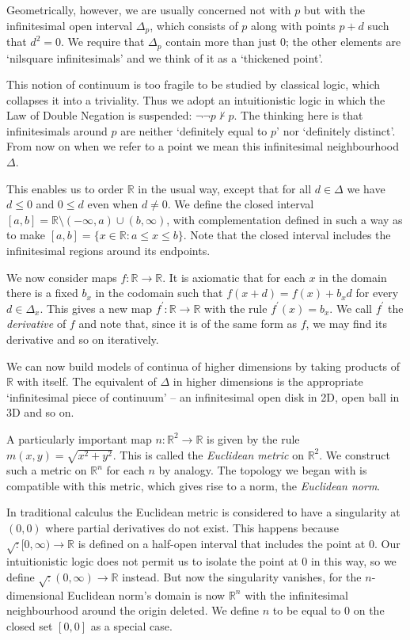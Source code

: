 \documentclass[oneside,english]{amsbook}
\numberwithin{section}{chapter}
\theoremstyle{plain}
\theoremstyle{definition}
\begin{document}
Geometrically, however, we are usually concerned not with $p$ but with the infinitesimal open interval $\Delta_p$, which consists of $p$ along with points $p + d$ such that $d^2 = 0$. We require that $\Delta_p$ contain more than just 0; the other elements are `nilsquare infinitesimals' and we think of it as a `thickened point'. 

This notion of continuum is too fragile to be studied by classical logic, which collapses it into a triviality. Thus we adopt an intuitionistic logic in which the Law of Double Negation is suspended: $\lnot\lnot p\nvdash p$. The thinking here is that infinitesimals around $p$ are neither `definitely equal to $p$' nor `definitely distinct'. From now on when we refer to a point we mean this infinitesimal neighbourhood $\Delta$.

This enables us to order $\mathbb{R}$ in the usual way, except that for all $d\in\Delta$ we have $d\le 0$ and $0\le d$ even when $d\ne 0$. We define the closed interval $[a, b] = \mathbb{R}\setminus(-\infty, a)\cup(b, \infty)$, with complementation defined in such a way as to make $[a, b] = \{x\in\mathbb{R} : a\le x\le b\}$. Note that the closed interval includes the infinitesimal regions around its endpoints.

We now consider maps $f:\mathbb{R}\to \mathbb{R}$. It is axiomatic that for each $x$ in the domain there is a fixed $b_x$ in the codomain such that $f(x + d) = f(x) + b_xd$ for every $d\in \Delta_x$. This gives a new map $f^\prime:\mathbb{R}\to \mathbb{R}$ with the rule $f^\prime (x) = b_x$. We call $f^\prime$ the \emph{derivative} of $f$ and note that, since it is of the same form as $f$, we may find its derivative and so on iteratively. 

We can now build models of continua of higher dimensions by taking products of $\mathbb{R}$ with itself. The equivalent of $\Delta$ in higher dimensions is the appropriate `infinitesimal piece of continuum' -- an infinitesimal open disk in 2D, open ball in 3D and so on.

A particularly important map $n:\mathbb{R}^2\to \mathbb{R}$ is given by the rule $m(x, y) = \sqrt{x^2 + y^2}$. This is called the \emph{Euclidean metric} on $\mathbb{R}^2$. We construct such a metric on $\mathbb{R}^n$ for each $n$ by analogy. The topology we began with is compatible with this metric, which gives rise to a norm, the \emph{Euclidean norm}.

In traditional calculus the Euclidean metric is considered to have a singularity at $(0, 0)$ where partial derivatives do not exist. This happens because $\sqrt:[0, \infty)\to \mathbb{R}$ is defined on a half-open interval that includes the point at 0. Our intuitionistic logic does not permit us to isolate the point at 0 in this way, so we define $\sqrt:(0, \infty)\to \mathbb{R}$ instead. But now the singularity vanishes, for the $n$-dimensional Euclidean norm's domain is now $\mathbb{R}^n$ with the infinitesimal neighbourhood around the origin deleted. We define $n$ to be equal to $0$ on the closed set $[0,0]$ as a special case.
\end{document}
